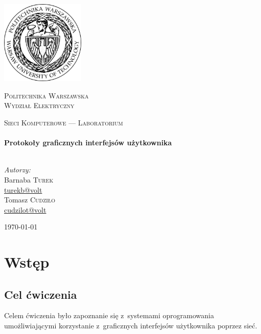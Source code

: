 \documentclass[a4paper,11pt]{article}
\begin{document}
\begin{titlepage}
  \begin{center}
    \includegraphics[width=0.3\textwidth]{logo.jpg}\\[1cm]
    \begin{onehalfspace}
      \textsc{\LARGE Politechnika Warszawska}\\[0.5cm]
      \textsc{\Large Wydział Elektryczny}\\[1.5cm]
    \end{onehalfspace}
    \textsc{Sieci Komputerowe --- Laboratorium}\\[0.5cm]

    \HRule \\[0.4cm]
    {\huge \bfseries Protokoły graficznych interfejsów użytkownika}\\[0.2cm]
    \HRule \\[1.5cm]

    \begin{flushleft} \large
      \emph{Autorzy:}\\
      Barnaba \textsc{Turek}\\
      \href{mailto:turekb@volt}{turekb@volt}\\
      Tomasz \textsc{Cudziło}\\
      \href{mailto:cudzilot@volt}{cudzilot@volt}\\
    \end{flushleft}
    \vfill

    {\large \today}
  \end{center}
\end{titlepage}
\sloppy


\setcounter{tocdepth}{4}
\tableofcontents


\section{Wstęp}

\subsection{Cel ćwiczenia}
Celem ćwiczenia było zapoznanie się z~systemami oprogramowania umożliwiającymi
korzystanie z~graficznych interfejsów użytkownika poprzez sieć.
\end{document}
